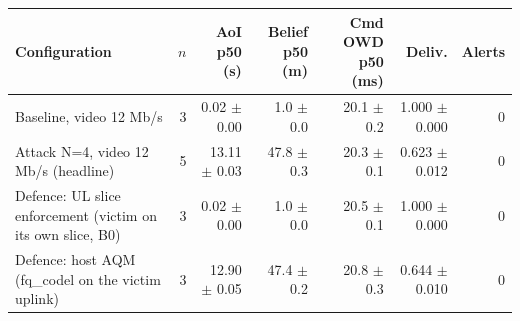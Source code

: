 \begin{tabular}{lrrrrrr}
\toprule
Configuration & $n$ & AoI p50 (s) & Belief p50 (m) & Cmd OWD p50 (ms) & Deliv. & Alerts \\
\midrule
Baseline, video 12 Mb/s & 3 & 0.02 $\pm$ 0.00 & 1.0 $\pm$ 0.0 & 20.1 $\pm$ 0.2 & 1.000 $\pm$ 0.000 & 0 \\
Attack N=4, video 12 Mb/s (headline) & 5 & 13.11 $\pm$ 0.03 & 47.8 $\pm$ 0.3 & 20.3 $\pm$ 0.1 & 0.623 $\pm$ 0.012 & 0 \\
Defence: UL slice enforcement (victim on its own slice, B0) & 3 & 0.02 $\pm$ 0.00 & 1.0 $\pm$ 0.0 & 20.5 $\pm$ 0.1 & 1.000 $\pm$ 0.000 & 0 \\
Defence: host AQM (fq\_codel on the victim uplink) & 3 & 12.90 $\pm$ 0.05 & 47.4 $\pm$ 0.2 & 20.8 $\pm$ 0.3 & 0.644 $\pm$ 0.010 & 0 \\
\bottomrule
\end{tabular}
